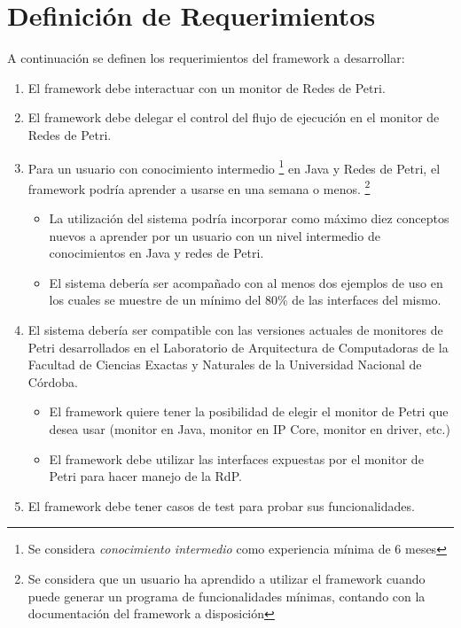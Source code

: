 \section{Definición de Requerimientos}
\label{sec:definicion_reqs}
A continuación se definen los requerimientos del framework a desarrollar:
\begin{enumerate}
    \item El framework debe interactuar con un monitor de Redes de Petri.
    \item El framework debe delegar el control del flujo de ejecución en el
    monitor de Redes de Petri.
    \item Para un usuario con conocimiento intermedio \footnote{Se
    considera \textit{conocimiento intermedio} como experiencia mínima de 6
    meses} en Java y Redes de Petri, el framework podría aprender a usarse en
    una semana o menos. \footnote{Se considera que un usuario ha aprendido a
    utilizar el framework cuando puede generar un programa de funcionalidades
    mínimas, contando con la documentación del framework a disposición}
        \begin{itemize}
            \item La utilización del sistema podría incorporar como máximo diez
            conceptos nuevos a aprender por un usuario con un nivel intermedio
            de conocimientos en Java y redes de Petri.
            \item El sistema debería ser acompañado con al menos dos ejemplos de uso
            en los cuales se muestre de un mínimo del 80\% de las interfaces del
            mismo.
        \end{itemize}
    \item El sistema debería ser compatible con las versiones actuales de
    monitores de Petri desarrollados en el Laboratorio de Arquitectura de Computadoras de la
    Facultad de Ciencias Exactas y Naturales de la Universidad Nacional de Córdoba.
        \begin{itemize}
            \item El framework quiere tener la posibilidad de elegir el monitor de
            Petri que desea usar (monitor en Java, monitor en IP Core, monitor en
            driver, etc.)
            \item El framework debe utilizar las interfaces expuestas por el monitor
            de Petri para hacer manejo de la RdP.
        \end{itemize}
    \item El framework debe tener casos de test para probar sus funcionalidades.

\end{enumerate}
